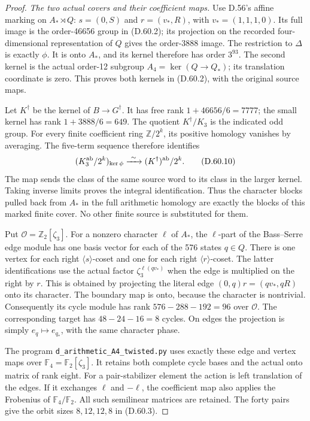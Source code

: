 \begin{proof}
\emph{The two actual covers and their coefficient maps.}
Use D.56's affine marking on \(A_*\rtimes Q\):
\(s=(0,S)\) and \(r=(v_*,R)\), with
\(v_*=(1,1,1,0)\). Its full image is the
order-46656 group in (D.60.2); its projection
on the recorded four-dimensional representation
of \(Q\) gives the order-3888 image. The
restriction to \(\Delta\) is exactly \(\phi\).
It is onto \(A_*\), and its kernel therefore
has order \(3^{93}\). The second kernel is
the actual order-12 subgroup
\(A_4=\ker(Q\to Q_*)\); its translation
coordinate is zero. This proves both kernels
in (D.60.2), with the original source maps.

Let \(K^\dagger\) be the kernel of
\(B\to G^\dagger\). It has free rank
\(1+46656/6=7777\); the small kernel has
rank \(1+3888/6=649\). The quotient
\(K^\dagger/K_3\) is the indicated odd
group. For every finite coefficient ring
\(\mathbb Z/2^k\), its positive homology
vanishes by averaging. The five-term sequence
therefore identifies
\[
 (K_3^{\rm ab}/2^k)_{\ker\phi}
       \xrightarrow{\ \sim\ }
                     (K^\dagger)^{\rm ab}/2^k.
 \tag{D.60.10}
\]
The map sends the class of the same source
word to its class in the larger kernel.
Taking inverse limits proves the integral
identification. Thus the character blocks
pulled back from \(A_*\) in the full
arithmetic homology are exactly the blocks
of this marked finite cover. No other
finite source is substituted for them.

Put \(\mathcal O=\mathbb Z_2[\zeta_3]\).
For a nonzero character \(\ell\) of
\(A_*\), the \(\ell\)-part of the
Bass--Serre edge module has one basis vector
for each of the 576 states \(q\in Q\).
There is one vertex for each right
\(\langle s\rangle\)-coset and one for
each right \(\langle r\rangle\)-coset.
The latter identifications use the actual
factor \(\zeta_3^{\ell(qv_*)}\) when the
edge is multiplied on the right by \(r\).
This is obtained by projecting the literal
edge \((0,q)r=(qv_*,qR)\) onto its
character. The boundary map is onto,
because the character is nontrivial.
Consequently its cycle module has rank
\(576-288-192=96\) over \(\mathcal O\).
The corresponding target has
\(48-24-16=8\) cycles. On edges the
projection is simply \(e_q\mapsto e_{q_*}\),
with the same character phase.

The program \texttt{d\_arithmetic\_A4\_twisted.py}
uses exactly these edge and vertex maps over
\(\mathbb F_4=\mathbb F_2[\zeta_3]\).
It retains both complete cycle bases and
the actual onto matrix of rank eight.
For a pair-stabilizer element the action
is left translation of the edges. If it
exchanges \(\ell\) and \(-\ell\), the
coefficient map also applies the Frobenius
of \(\mathbb F_4/\mathbb F_2\).
All such semilinear matrices are retained.
The forty pairs give the orbit sizes
\(8,12,12,8\) in (D.60.3).


\end{proof}
